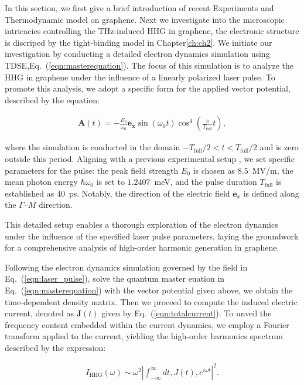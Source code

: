 In this section, we first give a brief introduction of recent Experiments and Thermodynamic model on
graphene. Next we investigate into the microscopic intricacies controlling the THz-induced \gls{HHG} in graphene, the electronic structure is discriped by the tight-binding
model in Chapter\ref{ch:ch2}.
We initiate our investigation by conducting a detailed electron dynamics simulation using \gls{TDSE},Eq.~(\ref{eqn:masterequation}). The focus of this simulation is to analyze the \gls{HHG} in graphene under the influence of a linearly polarized laser pulse. To promote this analysis, we adopt a specific form for the applied vector potential, described by the equation:

\begin{align}
	\mathbf A(t) = -\frac{E_0}{\omega_0}\mathbf{e_x} \sin(\omega_0 t)\cos^4 \left (\frac{\pi}{T_\mathrm{full}} t \right),
	\label{eqn:laser_pulse}
\end{align}

where the simulation is conducted in the domain $-T_\mathrm{full}/2 < t < T_\mathrm{full}/2$ and is zero outside this period. Aligning with a previous experimental setup \cite{hafez2018extremely}, we set specific parameters for the pulse: the peak field strength $E_0$ is chosen as $8.5$~MV/m, the mean photon energy $\hbar \omega_0$ is set to $1.2407$~meV, and the pulse duration $T_{\mathrm{full}}$ is established as $40$~ps. Notably, the direction of the electric field $\mathbf e_x$ is defined along the $\Gamma$--$M$ direction.

This detailed setup enables a thorough exploration of the electron dynamics under the influence of the specified laser pulse parameters, laying the groundwork for a comprehensive analysis of high-order harmonic generation in graphene.

Following the electron dynamics simulation governed by the field in Eq.~(\ref{eqn:laser_pulse}), solve the quantum master euation in Eq.~(\ref{eqn:masterequation}) with the vector potential given above, we obtain the time-dependent density matrix. Then we proceed to compute the induced electric current, denoted as $\mathbf J(t)$ given by Eq.~(\ref{eqn:totalcurrent}). To unveil the frequency content embedded within the current dynamics, we employ a Fourier transform applied to the current, yielding the high-order harmonics spectrum described by the expression:

\begin{align}
	I_{\mathrm{HHG}}(\omega)\sim \omega^2 \left | \int^{\infty}_{-\infty} dt , J(t) , e^{i\omega t} \right |^2.
	\label{eqn:spectrum}
\end{align}

